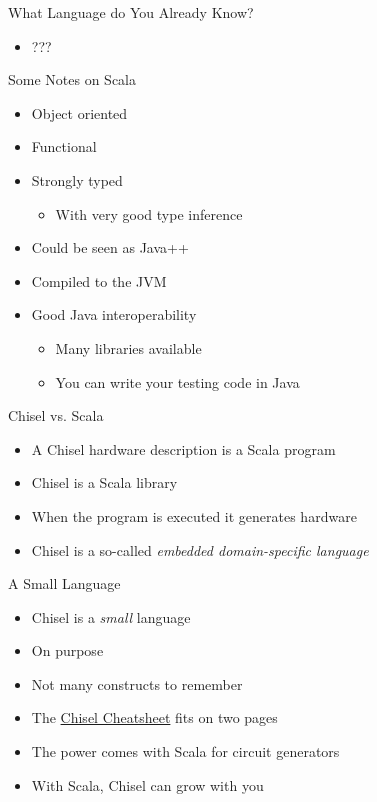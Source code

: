 \begin{frame}[fragile]{What Language do You Already Know?}
\begin{itemize}
\item ???
\end{itemize}
\end{frame}

\begin{frame}[fragile]{Some Notes on Scala}
\begin{itemize}
\item Object oriented
\item Functional
\item Strongly typed
\begin{itemize}
\item With very good type inference
\end{itemize}
\item Could be seen as Java++
\item Compiled to the JVM
\item Good Java interoperability
\begin{itemize}
\item Many libraries available
\item You can write your testing code in Java
\end{itemize}
\end{itemize}
\end{frame}

\begin{frame}[fragile]{Chisel vs. Scala}
\begin{itemize}
\item A Chisel hardware description is a Scala program
\item Chisel is a Scala library
\item When the program is executed it generates hardware
\item Chisel is a so-called \emph{embedded domain-specific language}
\end{itemize}
\end{frame}

\begin{frame}[fragile]{A Small Language}
\begin{itemize}
\item Chisel is a \emph{small} language
\item On purpose
\item Not many constructs to remember
\item The \href{https://github.com/freechipsproject/chisel-cheatsheet/releases/latest/download/chisel_cheatsheet.pdf}{Chisel Cheatsheet} fits on two pages
\item The power comes with Scala for circuit generators
\item With Scala, Chisel can grow with you
\end{itemize}
\end{frame}

